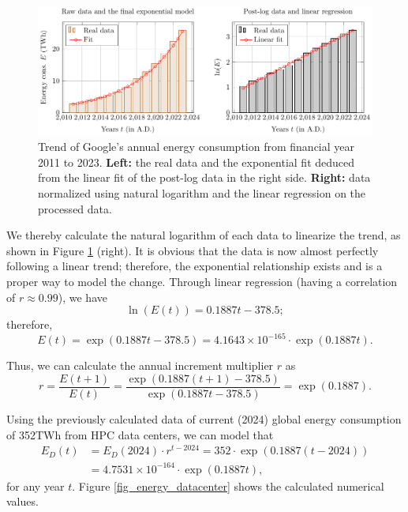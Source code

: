 \documentclass[12pt]{article}
\begin{document}
\begin{figure}[!t]
	\centering
	\caption{Trend of Google's annual energy consumption from financial year 2011 to 2023. \textbf{Left:} the real data and the exponential fit deduced from the linear fit of the post-log data in the right side. \textbf{Right:} data normalized using natural logarithm and the linear regression on the processed data.}
	\label{fig_google}
	\medskip
	\includegraphics{figures/trends/google.pdf}	
\end{figure}

We thereby calculate the natural logarithm of each data to linearize the trend, as shown in Figure \ref{fig_google} (right). It is obvious that the data is now almost perfectly following a linear trend; therefore, the exponential relationship exists and is a proper way to model the change. Through linear regression (having a correlation of $r \approx 0.99$), we have
\begin{equation}
	\ln \left(E(t)\right) = 0.1887t - 378.5;
\end{equation}
therefore,
\begin{equation}
	E(t) = \exp \left(0.1887t - 378.5\right) = 4.1643 \times 10^{-165} \cdot \exp \left(0.1887t\right).
\end{equation}

Thus, we can calculate the annual increment multiplier $r$ as
\begin{equation}
	r = \frac{E\left(t + 1\right)}{E(t)}
	= \frac{\exp \left(0.1887\left(t + 1\right) - 378.5\right)}{\exp \left(0.1887t - 378.5\right)}
	= \exp \left(0.1887\right).
\end{equation}

Using the previously calculated data of current (2024) global energy consumption of 352TWh from HPC data centers, we can model that
\begin{equation}
	\begin{aligned}
		E_D(t) &= E_D(2024) \cdot r^{t - 2024} = 352 \cdot \exp \left(0.1887(t - 2024)\right) \\
		&= 4.7531 \times 10^{-164} \cdot \exp \left(0.1887t\right),
	\end{aligned}
\end{equation}
for any year $t$. Figure \ref{fig_energy_datacenter} shows the calculated numerical values.
\end{document}
